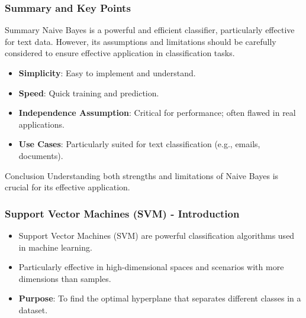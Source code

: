 \documentclass[aspectratio=169]{beamer}
\begin{document}
\begin{frame}[fragile]
    \frametitle{Summary and Key Points}
    \begin{block}{Summary}
        Naive Bayes is a powerful and efficient classifier, particularly effective for text data. However, its assumptions and limitations should be carefully considered to ensure effective application in classification tasks.
    \end{block}

    \begin{itemize}
        \item \textbf{Simplicity}: Easy to implement and understand.
        \item \textbf{Speed}: Quick training and prediction.
        \item \textbf{Independence Assumption}: Critical for performance; often flawed in real applications.
        \item \textbf{Use Cases}: Particularly suited for text classification (e.g., emails, documents).
    \end{itemize}

    \begin{block}{Conclusion}
        Understanding both strengths and limitations of Naive Bayes is crucial for its effective application.
    \end{block}
\end{frame}

\begin{frame}[fragile]
    \frametitle{Support Vector Machines (SVM) - Introduction}
    \begin{itemize}
        \item Support Vector Machines (SVM) are powerful classification algorithms used in machine learning.
        \item Particularly effective in high-dimensional spaces and scenarios with more dimensions than samples.
        \item \textbf{Purpose}: To find the optimal hyperplane that separates different classes in a dataset.
    \end{itemize}
\end{frame}
\end{document}
